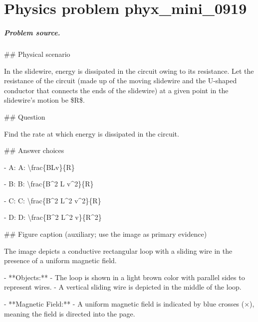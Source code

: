 
\chapter{Physics problem phyx\_mini\_0919}
\label{ch:PhyXMiniProblems_problem_phyx_mini_0919}

\paragraph{Problem source.}
\#\# Physical scenario

In the slidewire, energy is dissipated in the circuit owing to its resistance. Let the resistance of the circuit (made up of the moving slidewire and the U-shaped conductor that connects the ends of the slidewire) at a given point in the slidewire's motion be \$R\$.

\#\# Question

Find the rate at which energy is dissipated in the circuit.

\#\# Answer choices

- A: A: \textbackslash{}frac\{BLv\}\{R\}

- B: B: \textbackslash{}frac\{B\textasciicircum{}2 L v\textasciicircum{}2\}\{R\}

- C: C: \textbackslash{}frac\{B\textasciicircum{}2 L\textasciicircum{}2 v\textasciicircum{}2\}\{R\}

- D: D: \textbackslash{}frac\{B\textasciicircum{}2 L\textasciicircum{}2 v\}\{R\textasciicircum{}2\}

\#\# Figure caption (auxiliary; use the image as primary evidence)

The image depicts a conductive rectangular loop with a sliding wire in the presence of a uniform magnetic field. 

- **Objects:**
  - The loop is shown in a light brown color with parallel sides to represent wires.
  - A vertical sliding wire is depicted in the middle of the loop.

- **Magnetic Field:**
  - A uniform magnetic field is indicated by blue crosses (×), meaning the field is directed into the page.

